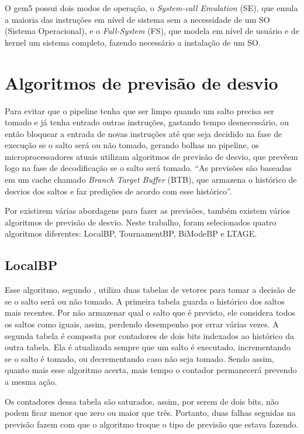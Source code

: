 \documentclass[12pt]{article}
\begin{document}
O gem5 possui dois modos de operação, o \textit{System-call Emulation} (SE), que emula a maioria das instruções em nível de sistema sem a necessidade de um SO (Sistema Operacional), e o \textit{Full-System} (FS), que modela em nível de usuário e de kernel um sistema completo, fazendo necessário a instalação de um SO.

\section{Algoritmos de previsão de desvio}

Para evitar que o pipeline tenha que ser limpo quando um salto precisa ser tomado e já tenha entrado outras instruções, gastando tempo desnecessário, ou então bloquear a entrada de novas instruções até que seja decidido na fase de execução se o salto será ou não tomado, gerando bolhas no pipeline, os microprocessadores atuais utilizam algoritmos de previsão de desvio, que prevêem logo na fase de decodificação se o salto será tomado. “As previsões são baseadas em um cache chamado \textit{Branch Target Buffer} (BTB), que armazena o histórico de desvios dos saltos e faz predições de acordo com esse histórico”\cite{colin2000worst}.

Por existirem várias abordagens para fazer as previsões, também existem vários algoritmos de previsão de desvio. Neste trabalho, foram selecionados quatro algoritmos diferentes: LocalBP, TournamentBP, BiModeBP e LTAGE.

\subsection{LocalBP}

Esse algoritmo, segundo \cite{mcfarling1993combining}, utiliza duas tabelas de vetores para tomar a decisão de se o salto será ou não tomado. A primeira tabela guarda o histórico dos saltos mais recentes. Por não armazenar qual o salto que é previsto, ele considera todos os saltos como iguais, assim, perdendo desempenho por errar várias vezes. A segunda tabela é composta por contadores de dois bits indexados ao histórico da outra tabela. Ela é atualizada sempre que um salto é executado, incrementando se o salto é tomado, ou decrementando caso não seja tomado. Sendo assim, quanto mais esse algoritmo acerta, mais tempo o contador permanecerá prevendo a mesma ação. 

Os contadores dessa tabela são saturados, assim, por serem de dois bits, não podem ficar menor que zero ou maior que três. Portanto, duas falhas seguidas na previsão fazem com que o algoritmo troque o tipo de previsão que estava fazendo.
\end{document}
